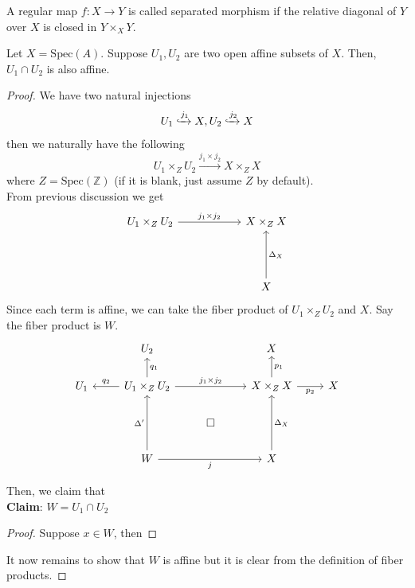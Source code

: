 \documentclass[oneside, 12pt, ]{scrbook}
\newcommand{\ZZ}{\mathbb Z}
\newcommand{\spec}{\mathrm{Spec}}
\theoremstyle{theorem}
\begin{document}
\begin{definition}
A regular map $f: X \rightarrow Y$ is called separated morphism if the relative diagonal of $Y$ over $X$ is closed in $Y \times_{X} Y$.
\end{definition}

\begin{lemma}
Let $X = \spec(A)$. Suppose $U_{1},U_{2}$ are two open affine subsets of $X$. Then, $U_{1}\cap U_{2}$ is also affine.
\end{lemma}

\begin{proof}
We have two natural injections $$U_{1} \xhookrightarrow{j_{1}} X , U_{2} \xhookrightarrow{j_{2}} X$$ then we naturally have the following $$U_{1} \times_{Z} U_{2} \xrightarrow{j_{1} \times j_{2}} X \times_{Z} X $$ where $Z = \spec(\ZZ)$ (if it is blank, just assume $Z$ by default). \\
From previous discussion we get 
\[\begin{tikzcd}
	{U_{1}\times_{Z}U_{2}} & {} & {X\times_{Z}X} \\
	{} && {} \\
	&& X
	\arrow["{j_{1}\times j_{2}}", from=1-1, to=1-3]
	\arrow["{\Delta_{X}}"', from=3-3, to=1-3]
\end{tikzcd}\]
Since each term is affine, we can take the fiber product of $U_{1}\times_{Z}U_{2}$ and $X$. Say the fiber product is $W$.
\[\begin{tikzcd}
	& {U_{2}} && X \\
	{U_{1}} & {U_{1}\times_{Z}U_{2}} & {} & {X\times_{Z}X} & X \\
	& {} & \square & {} \\
	& W && X
	\arrow["{\Delta_{X}}"', from=4-4, to=2-4]
	\arrow["{j_{1}\times j_{2}}", from=2-2, to=2-4]
	\arrow["{\Delta'}", from=4-2, to=2-2]
	\arrow["j"', from=4-2, to=4-4]
	\arrow["{p_{1}}"', from=2-4, to=1-4]
	\arrow["{p_{2}}"', from=2-4, to=2-5]
	\arrow["{q_{2}}"', from=2-2, to=2-1]
	\arrow["{q_{1}}"', from=2-2, to=1-2]
\end{tikzcd}\]

Then, we claim that \\

\textbf{Claim}: $W = U_{1} \cap U_{2}$

\begin{proof}
Suppose $x\in W$, then 
\end{proof}

It now remains to show that $W$ is affine but it is clear from the definition of fiber products.

\end{proof}
\end{document}
